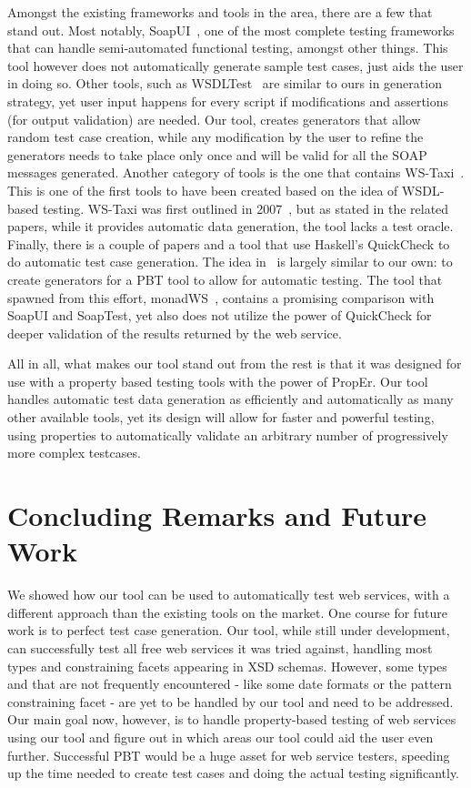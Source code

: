 \documentclass[submission,copyright,a4]{eptcs}
\begin{document}
Amongst the existing frameworks and tools in the area, there are a few that 
stand out. 
Most notably, SoapUI~\cite{soapUI}, one of the most complete testing frameworks
that can handle semi-automated functional testing, amongst other things. This 
tool however does not automatically generate sample test cases, just aids the
user in doing so.
Other tools, such as WSDLTest~\cite{wsdltest@IEEE06} are similar to ours in 
generation strategy, yet user input happens for every script if modifications 
and assertions (for output validation) are needed. Our tool, creates generators 
that allow random test case creation, while any modification by the user to
refine the generators needs to take place only once and will be valid for all
the SOAP messages generated.
Another category of tools is the one that contains WS-Taxi~\cite{taxi@IC-08}. 
This is one of the first tools to have been created based on the idea
of WSDL-based testing. WS-Taxi was first outlined in
2007~\cite{partition@AST-07}, but as stated in the related papers,
while it provides automatic data generation, the tool lacks a test oracle.
%
Finally, there is a couple of papers and a tool that use Haskell's
QuickCheck to do automatic test case generation. The idea
in~\cite{ws_quickcheck} is largely similar to our own: to create
generators for a PBT tool to allow for automatic testing. The tool
that spawned from this effort, monadWS~\cite{monadWS@AST-11}, contains
a promising comparison with SoapUI and SoapTest, yet also does not
utilize the power of QuickCheck for deeper validation of the results
returned by the web service.

All in all, what makes our tool stand out from the rest is that it 
was designed for use with a property based testing tools with the 
power of PropEr. Our tool handles automatic test data generation as
efficiently and automatically as many other available tools, yet its
design will allow for faster and powerful testing, using properties 
to automatically validate an arbitrary number of progressively more 
complex testcases.

\section{Concluding Remarks and Future Work}

We showed how our tool can be used to automatically test web services, with a
different approach than the existing tools on the market. 
One course for future work is to perfect test case generation. Our tool, 
while still under development, can successfully test all free web
services it was tried against, handling most types and constraining
facets appearing in XSD schemas. However, some types and that are not
frequently encountered - like some date formats or the pattern
constraining facet - are yet to be handled by our tool and need to be addressed.
Our main goal now, however, is to handle property-based testing of web services 
using our tool and figure out in which areas our tool could aid the user even 
further. Successful PBT would be a huge asset for web service testers, speeding 
up the time needed to create test cases and doing the actual testing 
significantly.



\end{document}
